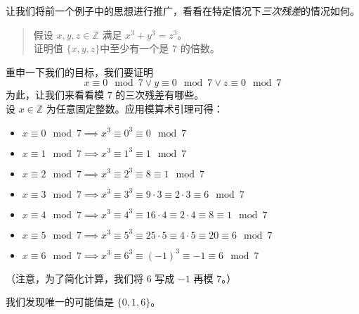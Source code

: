 \begin{example}
    让我们将前一个例子中的思想进行推广，看看在特定情况下\emph{三次残差}的情况如何。
    \begin{quote}
        假设 $x, y, z \in \mathbb{Z}$ 满足 $x^3+y^3=z^3$。\\
        证明值 $\{x, y, z\}$中至少有一个是 $7$ 的倍数。
    \end{quote}
    重申一下我们的目标，我们要证明
    \[x \equiv 0 \mod 7 \lor y \equiv 0 \mod 7 \lor z \equiv 0 \mod 7\]
    为此，让我们来看看模 $7$ 的三次残差有哪些。\\
    设 $x \in \mathbb{Z}$ 为任意固定整数。应用模算术引理可得：
    \begin{itemize}
        \item $x \equiv 0 \mod 7 \implies x^3 \equiv 0^3 \equiv 0 \mod 7$
        \item $x \equiv 1 \mod 7 \implies x^3 \equiv 1^3 \equiv 1 \mod 7$
        \item $x \equiv 2 \mod 7 \implies x^3 \equiv 2^3 \equiv 8 \equiv 1 \mod 7$
        \item $x \equiv 3 \mod 7 \implies x^3 \equiv 3^3 \equiv 9 \cdot 3 \equiv 2 \cdot 3 \equiv 6 \mod 7$
        \item $x \equiv 4 \mod 7 \implies x^3 \equiv 4^3 \equiv 16 \cdot 4 \equiv 2 \cdot 4 \equiv 8 \equiv 1 \mod 7$
        \item $x \equiv 5 \mod 7 \implies x^3 \equiv 5^3 \equiv 25 \cdot 5 \equiv 4 \cdot 5 \equiv 20 \equiv 6 \mod 7$
        \item $x \equiv 6 \mod 7 \implies x^3 \equiv 6^3 \equiv (-1)^3 \equiv -1 \equiv 6 \mod 7$
    \end{itemize}
    （注意，为了简化计算，我们将 $6$ 写成 $-1$ 再模 $7$。）

    我们发现唯一的可能值是 $\{0, 1, 6\}$。


\end{example}

